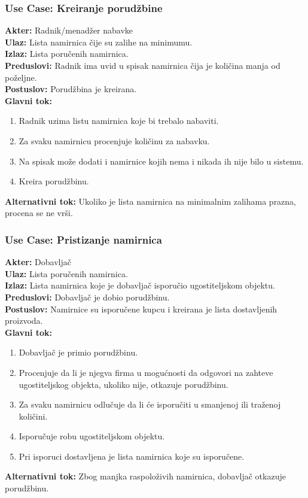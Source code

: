 \documentclass{article}
\begin{document}
\subsubsection{\textbf{Use Case}: Kreiranje porudžbine}
\textbf{Akter:} Radnik/menadžer nabavke\\
\textbf{Ulaz:} Lista namirnica čije su zalihe na minimumu.\\
\textbf{Izlaz:} Lista poručenih namirnica.\\
\textbf{Preduslovi:} Radnik ima uvid u spisak namirnica čija je količina manja od poželjne.\\
\textbf{Postuslov:} Porudžbina je kreirana.\\
\textbf{Glavni tok:} 
\begin{enumerate}
	\item Radnik uzima listu namirnica koje bi trebalo nabaviti.
	\item Za svaku namirnicu procenjuje količinu za nabavku. 
	\item Na spisak može dodati i namirnice kojih nema i nikada ih nije bilo u sistemu. 
	\item Kreira porudžbinu.
\end{enumerate}
\textbf{Alternativni tok:} Ukoliko je lista namirnica na minimalnim zalihama prazna, procena se ne vrši.\\

\subsubsection{\textbf{Use Case}:  Pristizanje namirnica}
\textbf{Akter:} Dobavljač\\
\textbf{Ulaz:} Lista poručenih namirnica.\\
\textbf{Izlaz:} Lista namirnica koje je dobavljač isporučio ugostiteljskom objektu.\\
\textbf{Preduslovi:} Dobavljač je dobio porudžbinu.\\
\textbf{Postuslov:} Namirnice su isporučene kupcu i kreirana je lista dostavljenih proizvoda.\\
\textbf{Glavni tok:} 
\begin{enumerate}
	\item Dobavljač je primio porudžbinu.
	\item Procenjuje da li je njegva firma u mogućnosti da odgovori na zahteve ugostiteljskog objekta, ukoliko nije, otkazuje porudžbinu.
	\item Za svaku namirnicu odlučuje da li će isporučiti u smanjenoj ili traženoj količini.
	\item Isporučuje robu ugostiteljskom objektu.
	\item Pri isporuci dostavljena je lista namirnica koje su isporučene.
\end{enumerate}
\textbf{Alternativni tok:} Zbog manjka raspoloživih namirnica, dobavljač otkazuje porudžbinu.\\
\end{document}
